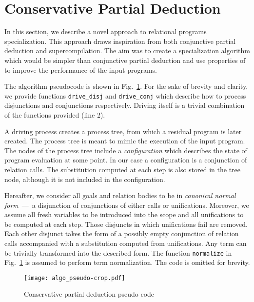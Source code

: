 \newcommand{\code}[1]{\texttt{#1}}

\section{Conservative Partial Deduction}

In this section, we describe a novel approach to relational programs specialization.
This approach draws inspiration from both conjunctive partial deduction and supercompilation.
The aim was to create a specialization algorithm which would be simpler than conjunctive partial deduction and use properties of \mk to improve the performance of the input programs.

The algorithm pseudocode is shown in Fig.~\ref{fig:ncpd-pseudo}.
For the sake of brevity and clarity, we provide functions \code{drive\_disj} and \code{drive\_conj} which describe how to process disjunctions and conjunctions respectively.
Driving itself is a trivial combination of the functions provided (line 2).

A driving process creates a process tree, from which a residual program is later created.
The process tree is meant to mimic the execution of the input program.
The nodes of the process tree include a \emph{configuration} which describes the state of program evaluation at some point.
In our case a configuration is a conjunction of relation calls.
The substitution computed at each step is also stored in the tree node, although it is not included in the configuration.

Hereafter, we consider all goals and relation bodies to be in \emph{canonical normal form}~---~a disjunction of conjunctions of either calls or unifications.
Moreover, we assume all fresh variables to be introduced into the scope and all unifications to be computed at each step.
Those disjuncts in which unifications fail are removed.
Each other disjunct takes the form of a possibly empty conjunction of relation calls accompanied with a substitution computed from unifications.
Any \mk term can be trivially transformed into the described form.
The function \code{normalize} in Fig.~\ref{fig:ncpd-pseudo} is assumed to perform term normalization.
The code is omitted for brevity.

\begin{figure}[!t]
  \centering
  \texttt{[image: algo\_pseudo-crop.pdf]}
  \caption{Conservative partial deduction pseudo code}
  \label{fig:ncpd-pseudo}
\end{figure}

